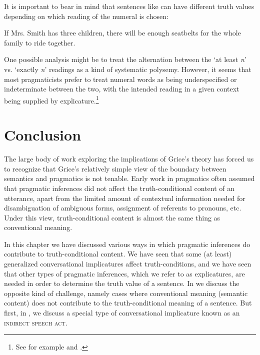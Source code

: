 It is important to bear in mind that sentences like  can have different truth values depending on which reading of the numeral is chosen:


\ea \label{ex:9.34}
If Mrs. Smith has three children, there will be enough seatbelts for the whole family to ride together.
\z


One possible analysis might be to treat the alternation between the ‘at least \textit{n}’ vs. ‘exactly \textit{n}’ readings as a kind of systematic polysemy. However, it seems that most pragmaticists prefer to treat numeral words as being underspecified or indeterminate between the two, with the intended reading in a given context being supplied by explicature.\footnote{See for example \citet{Horn1992} and \citet{Carston1998}.}

\largerpage
\section{Conclusion}\label{sec:9.5}

The large body of work exploring the implications of Grice’s theory has forced us to recognize that Grice’s relatively simple view of the boundary between semantics and pragmatics is not tenable. Early work in pragmatics often assumed that pragmatic inferences did not affect the truth-conditional content of an utterance, apart from the limited amount of contextual information needed for disambiguation of ambiguous forms, assignment of referents to pronouns, etc. Under this view, truth-conditional content is almost the same thing as conventional meaning.

 
In this chapter we have discussed various ways in which pragmatic inferences do contribute to truth-conditional content. We have seen that some (at least) generalized conversational implicatures affect truth-conditions, and we have seen that other types of pragmatic inferences, which we refer to as explicatures, are needed in order to determine the truth value of a sentence. In  we discuss the opposite kind of challenge, namely cases where conventional meaning (semantic content) does not contribute to the truth-conditional meaning of a sentence. But first, in , we discuss a special type of conversational implicature known as an \textsc{indirect speech act}.



